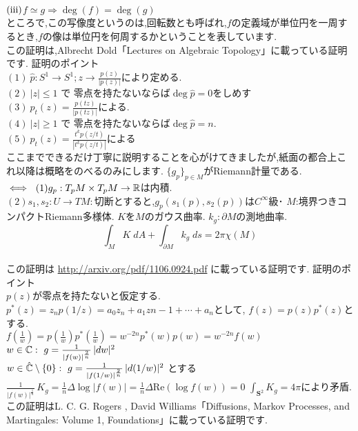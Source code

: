 $\rm (iii)$$f \simeq g \Rightarrow \deg(f) = \deg(g)$\\
\propx
ところで,この写像度というのは,回転数とも呼ばれ,$f$の定義域が単位円を一周するとき,$f$の像は単位円を何周するかということを表しています.
\proof[代数トポロジー的な代数学の基本定理の証明]
\leavevmode\\
この証明は,Albrecht Dold「Lectures on Algebraic Topology」に載っている証明です.
証明のポイント\\
$(1) \ \hat{p}:S^1\to S^1 ; z \to \frac{p(z)}{|p(z)|}$により定める.\\
$(2)\ |z|\le 1$ で 零点を持たないならば$\deg \hat{p} = 0$をしめす\\
$(3)\ p_t(z) =  \frac{p(tz)}{|p(tz)|}$による.\\
$(4)\ |z|\ge 1$ で 零点を持たないならば$\deg \hat{p} = n$.\\
$(5)\ p_t(z) =  \frac{t^kp(z/t)}{|t^kp(z/t)|}$による\\
\proofx
ここまでできるだけ丁寧に説明することを心がけてきましたが,紙面の都合上これ以降は概略をのべるのみにします.
$\{g_p\}_{p\in M}$がRiemann計量である.\\
$\iff \ (1)g_p : T_p M \times T_p M \to \R $は内積.\\
$(2)s_1,s_2:U\to TM:$切断とすると,$g_p(s_1(p),s_2(p))$は$C^\infty$級･
\thm
$M$:境界つきコンパクトRiemann多様体. $K$を$M$のガウス曲率. $k_g:\partial M$の測地曲率.
\[
\int_M K\;dA+\int_{\partial M}k_g\;ds=2\pi\chi(M)
\]
\thmx
\proof[微分幾何学による代数学の基本定理の証明]
\leavevmode\\
この証明は \url{http://arxiv.org/pdf/1106.0924.pdf} に載っている証明です.
証明のポイント\\
$p(z)$が零点を持たないと仮定する.\\
$p^{*}(z) = z_np(1/z) = a_0z_n + a_1z{n-1} + \cdots + a_n$として, $f(z)=p(z)p^*(z)$とする.\\
$f(\tfrac{1}{w}) = p(\tfrac{1}{w})p^*(\tfrac{1}{w}) = w^{-2n}p^*(w)p(w) = w^{-2n}f(w)$\\
$w\in \C :\ g=\frac{1}{|f(w)|^{\frac{2}{n}}}\,|dw|^2$\\
$w\in \hat{\C} \setminus \{0\}:\  g=\frac{1}{|f(1/w)|^{\frac{2}{n}}}\,|d(1/w)|^2$ とする\\
$\frac{1}{|f(w)|^{\frac{1}{n}}}\,K_g=\frac{1}{n}\Delta \log|f(w)|=\frac{1}{n}\Delta \text{Re}(\log f(w))=0$
$\int_{\mathbf{S}^2}K_g=4\pi$により矛盾.
\proofx
{}
\proof[確率論による代数学の基本定理の証明]
この証明はL. C. G. Rogers , David Williams「Diffusions, Markov Processes, and Martingales: Volume 1, Foundations」に載っている証明です.
$$
